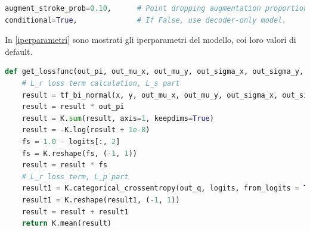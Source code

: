 \begin{minipage}{\linewidth}
\begin{minipage}{\linewidth}
\begin{lstlisting}[language = Python, frame = single, caption = {Iperparametri standard di sketch-rnn}, label={iperparametri}, captionpos = b]
augment_stroke_prob=0.10,      # Point dropping augmentation proportion.
conditional=True,              # If False, use decoder-only model.
\end{lstlisting}
\end{minipage}
In \ref{iperparametri} sono mostrati gli iperparametri del modello, coi loro valori di default. 
\begin{lstlisting}[language = Python, frame = single, caption = {Implementazione in Keras del calcolo dell'errore di ricostruzione, suddiviso fra i termini dell'errore nell'offset $(L_s)$ e l'errore degli stati della penna $(L_p)$}, captionpos = b]
def get_lossfunc(out_pi, out_mu_x, out_mu_y, out_sigma_x, out_sigma_y, out_ro, out_q, x, y, logits):
    # L_r loss term calculation, L_s part
    result = tf_bi_normal(x, y, out_mu_x, out_mu_y, out_sigma_x, out_sigma_y, out_ro)
    result = result * out_pi
    result = K.sum(result, axis=1, keepdims=True)
    result = -K.log(result + 1e-8)
    fs = 1.0 - logits[:, 2]
    fs = K.reshape(fs, (-1, 1))
    result = result * fs
    # L_r loss term, L_p part
    result1 = K.categorical_crossentropy(out_q, logits, from_logits = True)
    result1 = K.reshape(result1, (-1, 1))
    result = result + result1
    return K.mean(result)
\end{lstlisting}
\end{minipage}

\begin{minipage}{\linewidth}
\begin{lstlisting}[language = Python, frame = single, caption = {}, captionpos = b]

\end{lstlisting}
\end{minipage}
